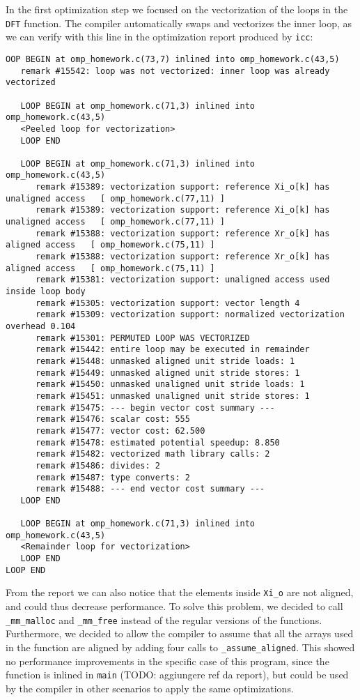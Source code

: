 \documentclass{article}
\begin{document}
In the first optimization step we focused on the vectorization of the loops in the \verb|DFT| function. The compiler automatically swaps and vectorizes the inner loop, as we can verify with this line in the optimization report produced by \verb|icc|:
\begin{verbatim}
OOP BEGIN at omp_homework.c(73,7) inlined into omp_homework.c(43,5)
   remark #15542: loop was not vectorized: inner loop was already vectorized

   LOOP BEGIN at omp_homework.c(71,3) inlined into omp_homework.c(43,5)
   <Peeled loop for vectorization>
   LOOP END

   LOOP BEGIN at omp_homework.c(71,3) inlined into omp_homework.c(43,5)
      remark #15389: vectorization support: reference Xi_o[k] has unaligned access   [ omp_homework.c(77,11) ]
      remark #15389: vectorization support: reference Xi_o[k] has unaligned access   [ omp_homework.c(77,11) ]
      remark #15388: vectorization support: reference Xr_o[k] has aligned access   [ omp_homework.c(75,11) ]
      remark #15388: vectorization support: reference Xr_o[k] has aligned access   [ omp_homework.c(75,11) ]
      remark #15381: vectorization support: unaligned access used inside loop body
      remark #15305: vectorization support: vector length 4
      remark #15309: vectorization support: normalized vectorization overhead 0.104
      remark #15301: PERMUTED LOOP WAS VECTORIZED
      remark #15442: entire loop may be executed in remainder
      remark #15448: unmasked aligned unit stride loads: 1 
      remark #15449: unmasked aligned unit stride stores: 1 
      remark #15450: unmasked unaligned unit stride loads: 1 
      remark #15451: unmasked unaligned unit stride stores: 1 
      remark #15475: --- begin vector cost summary ---
      remark #15476: scalar cost: 555 
      remark #15477: vector cost: 62.500 
      remark #15478: estimated potential speedup: 8.850 
      remark #15482: vectorized math library calls: 2 
      remark #15486: divides: 2 
      remark #15487: type converts: 2 
      remark #15488: --- end vector cost summary ---
   LOOP END

   LOOP BEGIN at omp_homework.c(71,3) inlined into omp_homework.c(43,5)
   <Remainder loop for vectorization>
   LOOP END
LOOP END
\end{verbatim}

From the report we can also notice that the elements inside \verb|Xi_o| are not aligned, and could thus decrease performance. To solve this problem, we decided to call \verb|_mm_malloc| and \verb|_mm_free| instead of the regular versions of the functions. Furthermore, we decided to allow the compiler to assume that all the arrays used in the function are aligned by adding four calls to \verb|_assume_aligned|. This showed no performance improvements in the specific case of this program, since the function is inlined in \verb|main| (TODO: aggiungere ref da report), but could be used by the compiler in other scenarios to apply the same optimizations.
\end{document}
